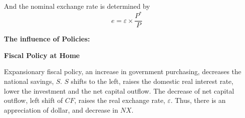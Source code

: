 \documentclass[12pt]{article}
\begin{document}
And the nominal exchange rate is determined by
\begin{equation*}
e = \varepsilon  \times \frac{P^{*}}{P}
\end{equation*}








{\textbf {The influence of Policies:}}


\begin{figure}[H]
\end{figure}



{\textbf {Fiscal Policy at Home}}

Expansionary fiscal policy, an increase in government purchasing, decreases the
national savings, $ S $. $ S $ shifts to the left, raises the domestic real interest
rate, lower the investment and the net capital outflow.
The decrease of net capital outflow, left shift of $ CF $, raises the real exchange
rate, $ \varepsilon $. Thus, there is an appreciation of dollar, and decrease in 
$ NX $.

\begin{figure}[H]
\end{figure}
\end{document}
